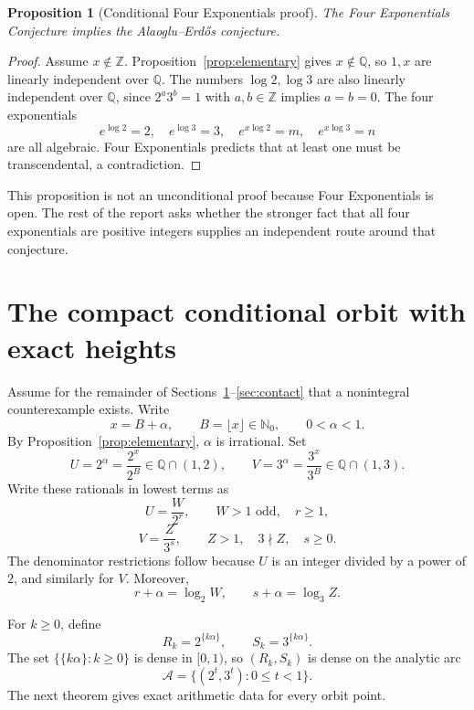 \documentclass[11pt]{article}
\newtheorem{proposition}[theorem]{Proposition}
\theoremstyle{definition}
\theoremstyle{remark}
\newcommand{\Q}{\mathbb Q}
\newcommand{\Z}{\mathbb Z}
\newcommand{\Nzero}{\mathbb N_0}
\newcommand{\fract}[1]{\{#1\}}
\begin{document}
\begin{proposition}[Conditional Four Exponentials proof]\label{prop:four-exp}
The Four Exponentials Conjecture implies the Alaoglu--Erd\H{o}s conjecture.
\end{proposition}

\begin{proof}
Assume $x\notin\Z$.  Proposition~\ref{prop:elementary} gives $x\notin\Q$, so
$1,x$ are linearly independent over $\Q$.  The numbers $\log2,\log3$ are also linearly
independent over $\Q$, since $2^a3^b=1$ with $a,b\in\Z$ implies $a=b=0$.  The four
exponentials
\[
 e^{\log2}=2,\quad e^{\log3}=3,\quad e^{x\log2}=m,\quad e^{x\log3}=n
\]
are all algebraic.  Four Exponentials predicts that at least one must be transcendental, a
contradiction.
\end{proof}

This proposition is not an unconditional proof because Four Exponentials is open.  The rest
of the report asks whether the stronger fact that all four exponentials are positive
integers supplies an independent route around that conjecture.

\section{The compact conditional orbit with exact heights}
\label{sec:orbit}

Assume for the remainder of Sections~\ref{sec:orbit}--\ref{sec:contact} that a nonintegral
counterexample exists.  Write
\[
  x=B+\alpha,
  \qquad B=\lfloor x\rfloor\in\Nzero,
  \qquad 0<\alpha<1.
\]
By Proposition~\ref{prop:elementary}, $\alpha$ is irrational.  Set
\[
  U=2^\alpha=\frac{2^x}{2^B}\in\Q\cap(1,2),
  \qquad
  V=3^\alpha=\frac{3^x}{3^B}\in\Q\cap(1,3).
\]
Write these rationals in lowest terms as
\begin{equation}
  U=\frac{W}{2^r},\qquad W>1\text{ odd},\quad r\ge1,
  \label{eq:Ured}
\end{equation}
\begin{equation}
  V=\frac{Z}{3^s},\qquad Z>1,\quad 3\nmid Z,\quad s\ge0.
  \label{eq:Vred}
\end{equation}
The denominator restrictions follow because $U$ is an integer divided by a power of $2$,
and similarly for $V$.  Moreover,
\begin{equation}
  r+\alpha=\log_2 W,
  \qquad
  s+\alpha=\log_3 Z.
  \label{eq:slope-two-forms}
\end{equation}

For $k\ge0$, define
\begin{equation}
  R_k=2^{\fract{k\alpha}},
  \qquad
  S_k=3^{\fract{k\alpha}}.
  \label{eq:compact-orbit}
\end{equation}
The set $\{\fract{k\alpha}:k\ge0\}$ is dense in $[0,1)$, so
$(R_k,S_k)$ is dense on the analytic arc
\[
  \mathcal A=\{(2^t,3^t):0\le t<1\}.
\]
The next theorem gives exact arithmetic data for every orbit point.
\end{document}
